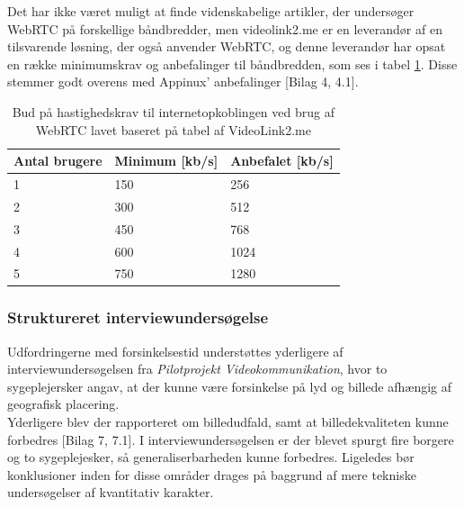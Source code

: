 Det har ikke været muligt at finde videnskabelige artikler, der undersøger WebRTC på forskellige båndbredder, men videolink2.me er en leverandør af en tilsvarende løsning, der også anvender WebRTC, og denne leverandør har opsat en række minimumskrav og anbefalinger til båndbredden, som ses i tabel \ref{tab:hastighedtabel}. Disse stemmer godt overens med Appinux' anbefalinger [Bilag 4, 4.1].
\begin{table}[H]
\caption{Bud på hastighedskrav til internetopkoblingen ved brug af WebRTC lavet baseret på tabel af VideoLink2.me \cite{videolink2me}}
\label{tab:hastighedtabel}
\centering
\begin{tabular}{|l|l|l|}
\hline
\textbf{Antal brugere} & \textbf{Minimum} [kb/s]  & \textbf{Anbefalet}  [kb/s] \\ \hline
1             & 150          & 256          \\ \hline
2             & 300          & 512          \\ \hline
3             & 450          & 768          \\ \hline
4             & 600          & 1024          \\ \hline
5             & 750          & 1280          \\ \hline
\end{tabular}

\end{table}

\subsubsection{Struktureret interviewundersøgelse}
Udfordringerne med forsinkelsestid understøttes yderligere af interviewundersøgelsen fra \textit{Pilotprojekt Videokommunikation}, hvor to sygeplejersker angav, at der kunne være forsinkelse på lyd og billede afhængig af geografisk placering. \\Yderligere blev der rapporteret om billedudfald, samt at billedekvaliteten kunne forbedres [Bilag 7, 7.1]. I interviewundersøgelsen er der blevet spurgt fire borgere og to sygeplejesker, så generaliserbarheden kunne forbedres. Ligeledes bør konklusioner inden for disse områder drages på baggrund af mere tekniske undersøgelser af kvantitativ karakter.


